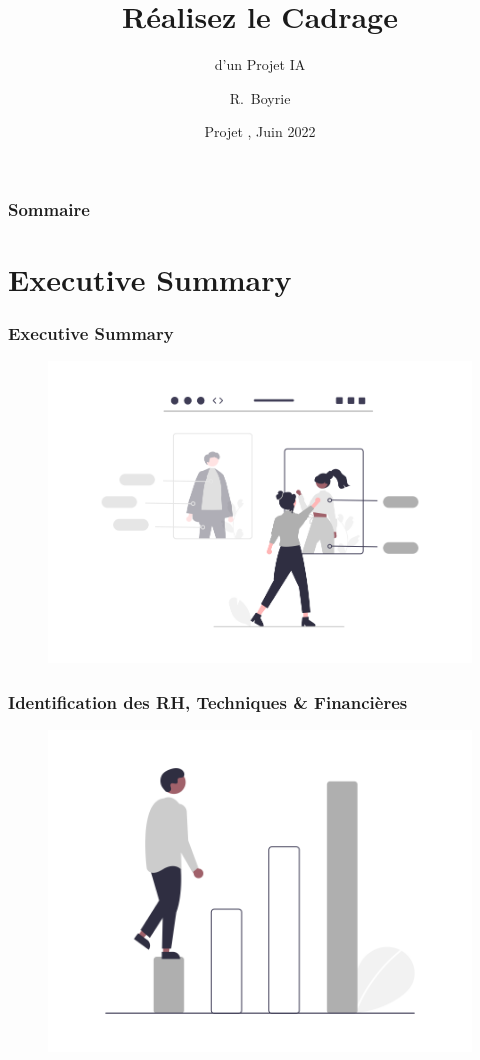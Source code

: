 \documentclass[9pt]{beamer}
\title[Formation d'Ingénieur en IA] %
{Réalisez le Cadrage}
\subtitle{d’un Projet IA}%
\author[Romain Boyrie] %
{R.~Boyrie}
\institute[OC - Msft] %
{
  Microsoft
  \and
  OpenClassrooms
}
\date[P11 juin 2022] %
{Projet \No 11, Juin 2022}
\begin{document}
\frame{\titlepage}


\begin{frame}
\frametitle{Sommaire}
\tableofcontents
\end{frame}

\section{Executive Summary}
\begin{frame}
	\frametitle{Executive Summary}
	\begin{figure}[!htb]
     \centering
     \includegraphics[width=.8\textwidth]{../media/Shopping}
   \label{Fig:shopping}
\end{figure}
\end{frame}
\begin{frame}
	\frametitle{Identification des RH, Techniques \& Financières}
	\begin{figure}[!htb]
     \centering
     \includegraphics[width=.8\textwidth]{../media/stepping}
   \label{Fig:stepping}
\end{figure}
\end{frame}
\end{document}
